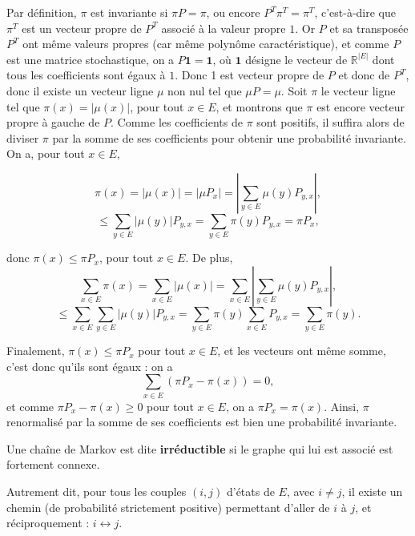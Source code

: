 \documentclass{article}
\begin{document}
\begin{tcolorbox}[colback=white,colframe=green!80!black,title=Démonstration]
Par définition, $\pi$ est invariante si $\pi P = \pi$, ou encore $P^T \pi^T = \pi^T$, c'est-à-dire que $\pi^T$ est un vecteur propre de $P^T$ associé à la valeur propre $1$.
Or $P$ et sa transposée $P^T$ ont même valeurs propres (car même polynôme caractéristique), et comme $P$ est une matrice stochastique, on a $P \mathbf{1} = \mathbf{1}$, où $\mathbf{1}$ désigne le vecteur de $\mathbb{R}^{|E|}$ dont tous les coefficients sont égaux à $1$.
Donc 1 est vecteur propre de $P$ et donc de $P^T$, donc il existe un vecteur ligne $\mu$ non nul tel que $\mu P = \mu$. Soit $\pi$ le vecteur ligne tel que $\pi(x) = |\mu(x)|$, pour tout $x \in E$, et montrons que $\pi$ est encore vecteur propre à gauche de $P$.
Comme les coefficients de $\pi$ sont positifs, il suffira alors de diviser $\pi$ par la somme de ses coefficients pour obtenir une probabilité invariante. On a, pour tout $x \in E$,

\end{tcolorbox} \begin{tcolorbox}[colback=white,colframe=green!80!black,title=Démonstration] %

\[
\pi(x) = |\mu(x)| = |\mu P_x| = \left| \sum_{y \in E} \mu(y) P_{y,x} \right|,
\]
\[
\leq \sum_{y \in E} |\mu(y)| P_{y,x} = \sum_{y \in E} \pi(y) P_{y,x} = \pi P_x,
\]

donc $\pi(x) \leq \pi P_x$, pour tout $x \in E$. De plus,
\[
\sum_{x \in E} \pi(x) = \sum_{x \in E} |\mu(x)| = \sum_{x \in E} \left| \sum_{y \in E} \mu(y) P_{y,x} \right|,
\]
\[
\leq \sum_{x \in E} \sum_{y \in E} |\mu(y)| P_{y,x} = \sum_{y \in E} \pi(y) \sum_{x \in E} P_{y,x} = \sum_{y \in E} \pi(y).
\]

Finalement, $\pi(x) \leq \pi P_x$ pour tout $x \in E$, et les vecteurs ont même somme, c’est donc qu’ils sont égaux : on a
\[
\sum_{x \in E} (\pi P_x - \pi(x)) = 0,
\]
et comme $\pi P_x - \pi(x) \geq 0$ pour tout $x \in E$, on a $\pi P_x = \pi(x)$. Ainsi, $\pi$ renormalisé par la somme de ses coefficients est bien une probabilité invariante.
\end{tcolorbox}
  

\begin{tcolorbox}[colback=white,colframe=blue!80!black,title=Chaîne de Markov irréductible]
Une chaîne de Markov est dite \textbf{irréductible} si le graphe qui lui est associé est fortement connexe.

Autrement dit, pour tous les couples $(i, j)$ d'états de $E$, avec $i \neq j$, il existe un chemin (de probabilité strictement positive) permettant d'aller de $i$ à $j$, et réciproquement : $i \leftrightarrow j$.
\end{tcolorbox}
\end{document}
